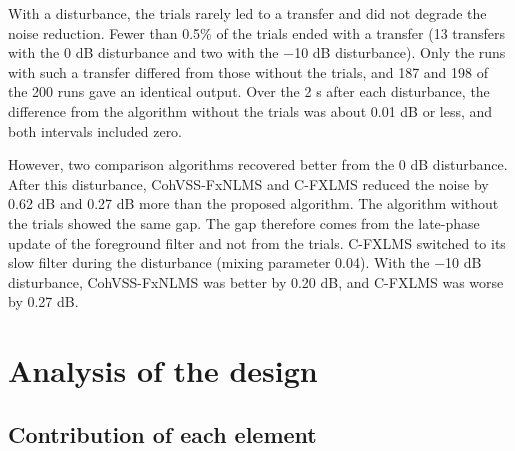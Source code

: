\documentclass[sip,biber]{now-journal}
\begin{document}
With a disturbance, the trials rarely led to a transfer and did not degrade the noise reduction. Fewer than 0.5\% of the trials ended with a transfer (13 transfers with the 0 dB disturbance and two with the −10 dB disturbance). Only the runs with such a transfer differed from those without the trials, and 187 and 198 of the 200 runs gave an identical output. Over the 2 s after each disturbance, the difference from the algorithm without the trials was about 0.01 dB or less, and both intervals included zero.

However, two comparison algorithms recovered better from the 0 dB disturbance. After this disturbance, CohVSS-FxNLMS and C-FXLMS reduced the noise by 0.62 dB and 0.27 dB more than the proposed algorithm. The algorithm without the trials showed the same gap. The gap therefore comes from the late-phase update of the foreground filter and not from the trials. C-FXLMS switched to its slow filter during the disturbance (mixing parameter 0.04). With the −10 dB disturbance, CohVSS-FxNLMS was better by 0.20 dB, and C-FXLMS was worse by 0.27 dB.

\hypertarget{sec:7}{%
\section{Analysis of the design}\label{sec:7}}

\hypertarget{sec:7.1}{%
\subsection{Contribution of each element}\label{sec:7.1}}


\end{document}
